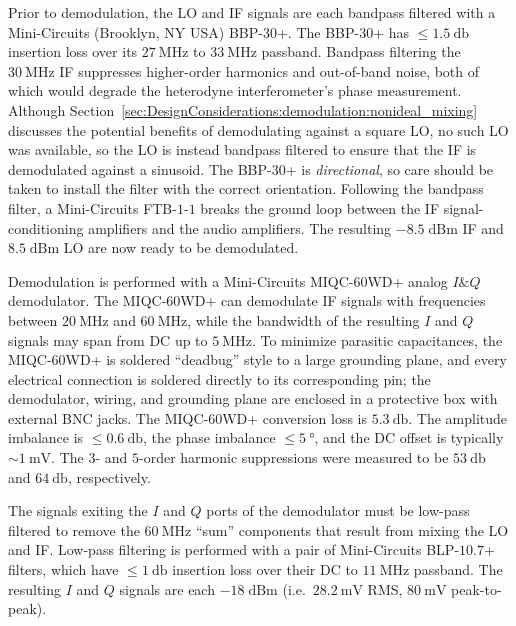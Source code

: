 Prior to demodulation, the LO and IF signals are each bandpass filtered
with a Mini-Circuits (Brooklyn, NY USA) {BBP-$30$+}.
The {BBP-$30$+} has $\leq \SI{1.5}{\decibel}$ insertion loss over
its $\SI{27}{\mega\hertz}$ to $\SI{33}{\mega\hertz}$ passband.
Bandpass filtering the $\SI{30}{\mega\hertz}$ IF
suppresses higher-order harmonics and out-of-band noise,
both of which would degrade the heterodyne interferometer's phase measurement.
Although Section~\ref{sec:DesignConsiderations:demodulation:nonideal_mixing}
discusses the potential benefits of demodulating against a square LO,
no such LO was available, so
the LO is instead bandpass filtered
to ensure that the IF is demodulated against a sinusoid.
The {BBP-$30$+} is \emph{directional}, so
care should be taken to install the filter
with the correct orientation.
Following the bandpass filter,
a Mini-Circuits {FTB-$1$-$1$} breaks the ground loop between
the IF signal-conditioning amplifiers and
the audio amplifiers.
The resulting $-8.5 \; \text{dBm}$ IF and $8.5 \; \text{dBm}$ LO
are now ready to be demodulated.

Demodulation is performed with a
Mini-Circuits {MIQC-$60$WD+}
analog $I\&Q$ demodulator.
The {MIQC-$60$WD+} can demodulate IF signals with frequencies between
$\SI{20}{\mega\hertz}$ and $\SI{60}{\mega\hertz}$, while
the bandwidth of the resulting $I$ and $Q$ signals
may span from DC up to $\SI{5}{\mega\hertz}$.
\graffito{\textcolor{red}{reference for ``deadbug''?}}
To minimize parasitic capacitances,
the {MIQC-$60$WD+} is soldered ``deadbug'' style
to a large grounding plane, and
every electrical connection is soldered
directly to its corresponding pin;
the demodulator, wiring, and grounding plane
are enclosed in a protective box with external BNC jacks.
The {MIQC-$60$WD+} conversion loss is $\SI{5.3}{\decibel}$.
The amplitude imbalance is $\leq \SI{0.6}{\decibel}$,
the phase imbalance $\leq \SI{5}{\degree}$, and
the DC offset is typically $\sim \SI{1}{\milli\volt}$.
The $3$- and $5$-order harmonic suppressions
were measured to be $\SI{53}{\decibel}$ and $\SI{64}{\decibel}$, respectively.

The signals exiting the $I$ and $Q$ ports of the demodulator
must be low-pass filtered
to remove the $\SI{60}{\mega\hertz}$ ``sum'' components
that result from mixing the LO and IF.
Low-pass filtering is performed
with a pair of Mini-Circuits {BLP-$10.7$+} filters, which
have $\leq \SI{1}{\decibel}$ insertion loss
over their DC to $\SI{11}{\mega\hertz}$ passband.
The resulting $I$ and $Q$ signals are each
$-18 \; \text{dBm}$
(i.e.\ $\SI{28.2}{\milli\volt}$ RMS,
$\SI{80}{\milli\volt}$ peak-to-peak).


